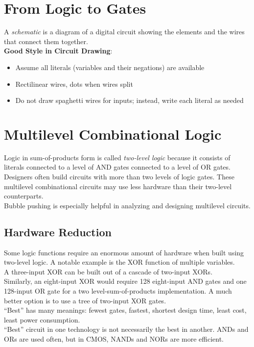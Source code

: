 \documentclass[12pt]{article}
\theoremstyle{definition}
\begin{document}
  \newpage
  \section{From Logic to Gates}
  A \emph{schematic} is a diagram of a digital circuit showing the elements and the wires that connect them together. \\

  \textbf{Good Style in Circuit Drawing}:
  \begin{itemize}
    \item Assume all literals (variables and their negations) are available
    \item Rectilinear wires, dots when wires split
    \item Do not draw spaghetti wires for inputs; instead, write each literal as needed
  \end{itemize}

  \section{Multilevel Combinational Logic}
  Logic in sum-of-products form is called \emph{two-level logic} because it consists of literals connected to a level of AND gates connected to a level of OR gates. \\
  Designers often build circuits with more than two levels of logic gates.
  These multilevel combinational circuits may use less hardware than their two-level counterparts. \\
  Bubble pushing is especially helpful in analyzing and designing multilevel circuits.

  \subsection{Hardware Reduction}
  Some logic functions require an enormous amount of hardware when built using two-level logic.
  A notable example is the XOR function of multiple variables. \\
  A three-input XOR can be built out of a cascade of two-input XORs. \\
  Similarly, an eight-input XOR would require 128 eight-input AND gates and one 128-input OR gate for a two level-sum-of-products implementation. A much better option is to use a tree of two-input XOR gates. \\

  ``Best'' has many meanings: fewest gates, fastest, shortest design time, least cost, least power consumption. \\
  ``Best'' circuit in one technology is not necessarily the best in another.
  ANDs and ORs are used often, but in CMOS, NANDs and NORs are more efficient.
\end{document}
